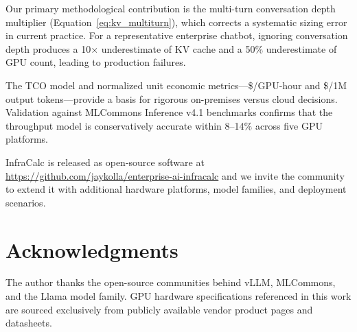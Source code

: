 \documentclass{article}
\begin{document}
Our primary methodological contribution is the multi-turn conversation depth
multiplier (Equation~\ref{eq:kv_multiturn}), which corrects a systematic
sizing error in current practice. For a representative enterprise chatbot,
ignoring conversation depth produces a 10$\times$ underestimate of KV cache
and a 50\% underestimate of GPU count, leading to production failures.

The TCO model and normalized unit economic metrics—\$/GPU-hour and
\$/1M output tokens—provide a basis for rigorous on-premises versus cloud
decisions. Validation against MLCommons Inference v4.1 benchmarks confirms
that the throughput model is conservatively accurate within 8--14\% across
five GPU platforms.

InfraCalc is released as open-source software at
\url{https://github.com/jaykolla/enterprise-ai-infracalc} and we invite the
community to extend it with additional hardware platforms, model families,
and deployment scenarios.

\section*{Acknowledgments}
The author thanks the open-source communities behind vLLM, MLCommons, and
the Llama model family. GPU hardware specifications referenced in this work
are sourced exclusively from publicly available vendor product pages and
datasheets.



\end{document}

